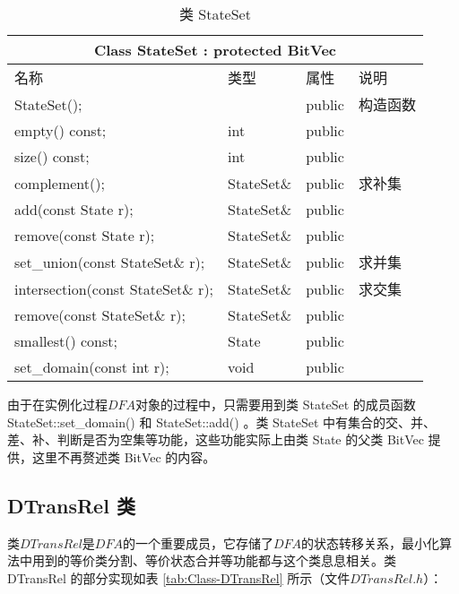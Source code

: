 \begin{table}[!htbp]
    \caption{类 StateSet}
    \label{tab:Class-StateSet}
    \centering
    \small%
    \setlength{\tabcolsep}{4pt}%
    \renewcommand{\arraystretch}{1.2}%
        \begin{tabular}{llll} %
        \toprule 
         \multicolumn{4}{c}{Class StateSet : protected BitVec} \\
        \midrule
        名称& 类型 & 属性  &\mbox{说明} \\
        \midrule 
        StateSet(); &  &  public & 构造函数 \\
        empty() const; & int & public & \\
        size() const;  & int & public & \\
        complement();  & StateSet\& & public & 求补集 \\
        add(const State r);  & StateSet\& & public &  \\
        remove(const State r);  & StateSet\& & public &  \\
        set\_union(const StateSet\& r);  & StateSet\& & public & 求并集 \\
        intersection(const StateSet\& r);  & StateSet\& & public & 求交集 \\
        remove(const StateSet\& r);  & StateSet\& & public &  \\
        smallest() const; & State & public & \\
        set\_domain(const int r); & void & public & \\
        \bottomrule 
    \end{tabular}
\end{table}

由于在实例化过程$DFA$对象的过程中，只需要用到类 StateSet 的成员函数 StateSet::set\_domain() 和 StateSet::add() 。类 StateSet 中有集合的交、并、差、补、判断是否为空集等功能，这些功能实际上由类 State 的父类 BitVec 提供，这里不再赘述类 BitVec 的内容。


\subsection{DTransRel 类}

类$DTransRel$是$DFA$的一个重要成员，它存储了$DFA$的状态转移关系，最小化算法中用到的等价类分割、等价状态合并等功能都与这个类息息相关。类 DTransRel 的部分实现如表 \ref{tab:Class-DTransRel} 所示（文件$DTransRel.h$）：

